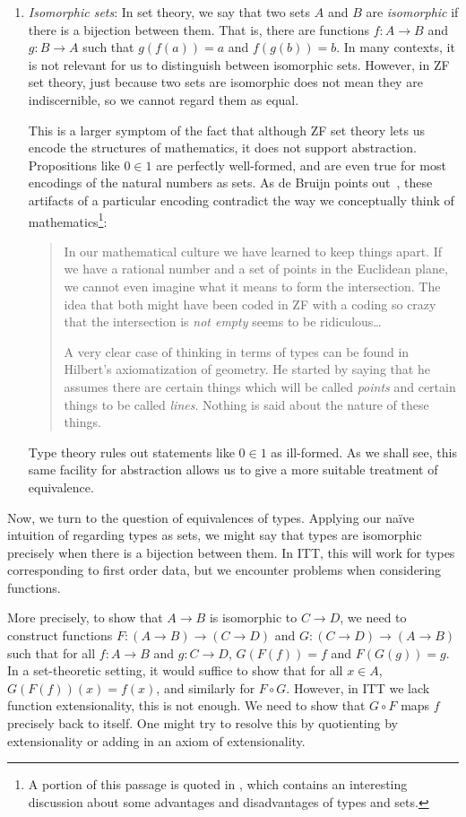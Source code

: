 \documentclass[12pt]{article}
\begin{document}
\begin{enumerate}
\item \emph{Isomorphic sets}: In set theory, we say that two sets $A$ and $B$
are \emph{isomorphic} if there is a bijection between them. That is, there are
functions $f : A \to B$ and $g : B \to A$ such that $g(f(a)) = a$ and $f(g(b))
= b$. In many contexts, it is not relevant for us to distinguish between
isomorphic sets. However, in ZF set theory, just because two sets are
isomorphic does not mean they are indiscernible, so we cannot regard them
as equal.

This is a larger symptom of the fact that although ZF set theory lets us encode
the structures of mathematics, it does not support abstraction. Propositions
like $0 \in 1$ are perfectly well-formed, and are even true for most encodings
of the natural numbers as sets. As de Bruijn points out~\cite{deBruijn95},
these artifacts of a particular encoding contradict the way we conceptually
think of mathematics\footnote{A portion of this passage is quoted in
\cite{Lamport99}, which contains an interesting discussion about some
advantages and disadvantages of types and sets.}:
%
\begin{quotation}
In our mathematical culture we have learned to keep things apart. If we have a
rational number and a set of points in the Euclidean plane, we cannot even
imagine what it means to form the intersection. The idea that both might have
been coded in ZF with a coding so crazy that the intersection is \emph{not
empty} seems to be ridiculous\dots

A very clear case of thinking in terms of types can be found in Hilbert's
axiomatization of geometry. He started by saying that he assumes there are
certain things which will be called \emph{points} and certain things to be
called \emph{lines}. Nothing is said about the nature of these things.
\end{quotation}
%
Type theory rules out statements like $0 \in 1$ as ill-formed. As we shall see,
this same facility for abstraction allows us to give a more suitable treatment
of equivalence.

\end{enumerate}

Now, we turn to the question of equivalences of types. Applying our na\"ive
intuition of regarding types as sets, we might say that types are isomorphic
precisely when there is a bijection between them. In ITT, this will work for
types corresponding to first order data, but we encounter problems when
considering functions.

More precisely, to show that $A \to B$ is isomorphic to $C \to D$, we need to
construct functions $F: (A \to B) \to (C \to D)$ and $G: (C \to D) \to (A \to
B)$ such that for all $f : A \to B$ and $g : C \to D$, $G(F(f)) = f$ and
$F(G(g)) = g$. In a set-theoretic setting, it would suffice to show that for
all $x \in A$, $G(F(f))(x) = f(x)$, and similarly for $F \circ G$. However, in
ITT we lack function extensionality, this is not enough. We need to show that
$G \circ F$ maps $f$ precisely back to itself.  One might try to resolve this
by quotienting by extensionality or adding in an axiom of extensionality.
\end{document}
